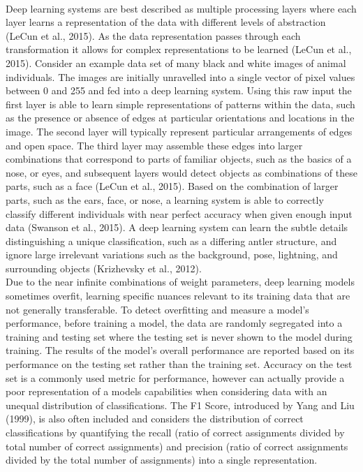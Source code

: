 \documentclass[11pt]{article}
\begin{document}
\newline
\\
Deep learning systems are best described as multiple processing layers where each layer learns a representation of the data with different levels of abstraction (LeCun et al., 2015). As the data representation passes through each transformation it allows for complex representations to be learned (LeCun et al., 2015). Consider an example data set of many black and white images of animal individuals. The images are initially unravelled into a single vector of pixel values between 0 and 255 and fed into a deep learning system. Using this raw input the first layer is able to learn simple representations of patterns within the data, such as the presence or absence of edges at particular orientations and locations in the image. The second layer will typically represent particular arrangements of edges and open space. The third layer may assemble these edges into larger combinations that correspond to parts of familiar objects, such as the basics of a nose, or eyes, and subsequent layers would detect objects as combinations of these parts, such as a face (LeCun et al., 2015). Based on the combination of larger parts, such as the ears, face, or nose, a learning system is able to correctly classify different individuals with near perfect accuracy when given enough input data (Swanson et al., 2015). A deep learning system can learn the subtle details distinguishing a unique classification, such as a differing antler structure, and ignore large irrelevant variations such as the background, pose, lightning, and surrounding objects (Krizhevsky et al., 2012).
\newline
\\
Due to the near infinite combinations of weight parameters, deep learning models sometimes overfit, learning specific nuances relevant to its training data that are not generally transferable. To detect overfitting and measure a model's performance, before training a model, the data are randomly segregated into a training and testing set where the testing set is never shown to the model during training. The results of the model's overall performance are reported based on its performance on the testing set rather than the training set. Accuracy on the test set is a commonly used metric for performance, however can actually provide a poor representation of a models capabilities when considering data with an unequal distribution of classifications. The F1 Score, introduced by Yang and Liu (1999), is also often included and considers the distribution of correct classifications by quantifying the recall (ratio of correct assignments divided by total number of correct assignments) and precision (ratio of correct assignments divided by the total number of assignments) into a single representation.
\end{document}

